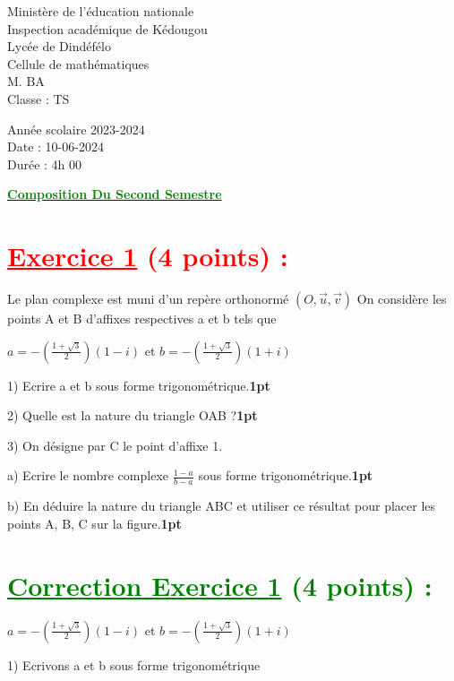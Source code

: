 \documentclass[12pt]{article}
\begin{document}
\begin{minipage}{0.5\textwidth}
	Ministère de l'éducation nationale  \\
	Inspection académique de Kédougou   \\
	Lycée de Dindéfélo            \\
	Cellule de mathématiques            \\
	M. BA                          \\
	Classe : TS  \\
\end{minipage}
\begin{minipage}{0.5\textwidth}
	Année scolaire 2023-2024 \\
	Date : 10-06-2024 \\
	Durée : 4h 00 \\
\end{minipage}

\begin{center}
	\textbf{{\underline{\textcolor{green}{Composition Du Second Semestre}}}}
\end{center}

\section*{\textcolor{red}{\underline{Exercice 1} (4 points) :}}
Le plan complexe est muni d’un repère orthonormé $(O,\vec{u},\vec{v})$
On considère les points A et B d’affixes respectives a et b tels que

$a=-(\frac{1+\sqrt{3}}{2})(1-i)$ et $b=-(\frac{1+\sqrt{3}}{2})(1+i)$ 

1) Ecrire a et b sous forme trigonométrique.\textbf{1pt}

2) Quelle est la nature du triangle OAB ?\textbf{1pt}

3) On désigne par C le point d’affixe 1.

a) Ecrire le nombre complexe $\frac{1-a}{b-a}$  sous forme trigonométrique.\textbf{1pt}

b) En déduire la nature du triangle ABC et  utiliser ce résultat pour placer les points A, B, C sur la figure.\textbf{1pt}
\section*{\textcolor{green}{\underline{Correction Exercice 1} (4 points) :}}
$a=-(\frac{1+\sqrt{3}}{2})(1-i)$ et $b=-(\frac{1+\sqrt{3}}{2})(1+i)$ 

1) Ecrivons a et b sous forme trigonométrique
\end{document}
